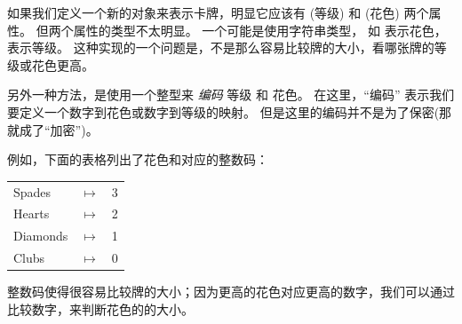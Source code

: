   


如果我们定义一个新的对象来表示卡牌，明显它应该有  (等级) 和  (花色)
两个属性。  但两个属性的类型不太明显。  一个可能是使用字符串类型，
如  表示花色， 表示等级。  这种实现的一个问题是，不是那么容易比较牌的大小，看哪张牌的等级或花色更高。

  
  


另外一种方法，是使用一个整型来 {\em 编码} 等级 和 花色。
在这里，``编码'' 表示我们要定义一个数字到花色或数字到等级的映射。
但是这里的编码并不是为了保密(那就成了``加密'')。

\newcommand{\mymapsto}{$\mapsto$}


例如，下面的表格列出了花色和对应的整数码：

\begin{tabular}{l c l}
Spades & \mymapsto & 3 \\
Hearts & \mymapsto & 2 \\
Diamonds & \mymapsto & 1 \\
Clubs & \mymapsto & 0
\end{tabular}


整数码使得很容易比较牌的大小；因为更高的花色对应更高的数字，我们可以通过比较数字，来判断花色的的大小。


